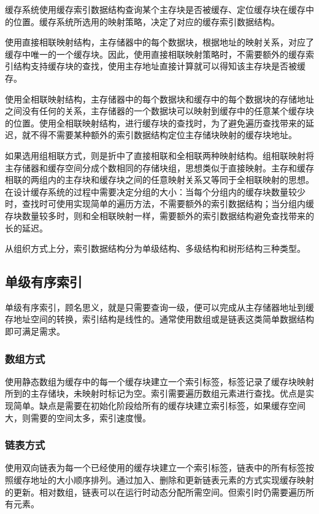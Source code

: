 缓存系统使用缓存索引数据结构查询某个主存块是否被缓存、定位缓存块在缓存中的位置。缓存系统所选用的映射策略，决定了对应的缓存索引数据结构。

使用直接相联映射结构，主存储器中的每个数据块，根据地址的映射关系，对应了缓存中唯一的一个缓存块。因此，使用直接相联映射策略时，不需要额外的缓存索引结构支持缓存块的查找，使用主存地址直接计算就可以得知该主存块是否被缓存。

使用全相联映射结构，主存储器中的每个数据块和缓存中的每个数据块的存储地址之间没有任何的关系，主存储器的一个数据块可以映射到缓存中的任意某个缓存块的位置。使用全相联映射结构，进行缓存块的查找时，为了避免遍历查找带来的延迟，就不得不需要某种额外的索引数据结构定位主存储块映射的缓存块地址。

如果选用组相联方式，则是折中了直接相联和全相联两种映射结构。组相联映射将主存储器和缓存空间分成个数相同的存储块组，思想类似于直接映射。主存和缓存相联的两组内的主存块和缓存块之间的任意映射关系又等同于全相联映射的思想。在设计缓存系统的过程中需要决定分组的大小：当每个分组内的缓存块数量较少时，查找时可使用实现简单的遍历方法，不需要额外的索引数据结构；当分组内缓存块数量较多时，则和全相联映射一样，需要额外的索引数据结构避免查找带来的长的延迟。

从组织方式上分，索引数据结构分为单级结构、多级结构和树形结构三种类型。

\subsection{单级有序索引}
单级有序索引，顾名思义，就是只需要查询一级，便可以完成从主存储器地址到缓存地址空间的转换，索引结构是线性的。通常使用数组或是链表这类简单数据结构即可满足需求。

\subsubsection{数组方式}
使用静态数组为缓存中的每一个缓存块建立一个索引标签，标签记录了缓存块映射所到的主存储块，未映射时标记为空。索引需要遍历数组元素进行查找。优点是实现简单。缺点是需要在初始化阶段给所有的缓存块建立索引标签，如果缓存空间大，则需要的空间太多，索引速度慢。

\subsubsection{链表方式}
使用双向链表为每一个已经使用的缓存块建立一个索引标签，链表中的所有标签按照缓存地址的大小顺序排列。通过加入、删除和更新链表元素的方式实现缓存映射的更新。相对数组，链表可以在运行时动态分配所需空间。但索引时仍需要遍历所有元素。

